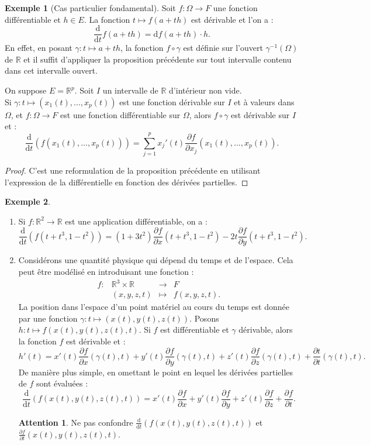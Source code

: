 \documentclass[french]{article}
\newcommand{\R}{\mathbb{R}}
\newcommand{\inv}{^{-1}}
\renewcommand{\d}{\text{d}}
\theoremstyle{plain}
\theoremstyle{definition}
\newtheorem*{ex}{Exemple}
\newtheorem*{attention}{Attention}
\theoremstyle{remark}
\begin{document}
\begin{ex}[Cas particulier fondamental]
	Soit $f:\Omega\to F$ une fonction différentiable et $h\in E$. La fonction $t\mapsto f(a+th)$ est dérivable et l'on a :
	$$\frac{\d}{\d t}f(a+th)=\d f(a+th)\cdot h.$$
	En effet, en posant $\gamma:t\mapsto a+th$, la fonction $f\circ\gamma$ est définie sur l'ouvert $\gamma\inv(\Omega)$ de $\R$ et il suffit d'appliquer la proposition précédente sur tout intervalle contenu dans cet intervalle ouvert.
\end{ex}

\begin{cor}%
	On suppose $E=\R^p$. Soit $I$ un intervalle de $\R$ d'intérieur non vide.\\
	Si $\gamma:t\mapsto(x_1(t),\ldots,x_p(t))$ est une fonction dérivable sur $I$ et à valeurs dans $\Omega$, et $f:\Omega\to F$ est une fonction différentiable sur $\Omega$, alors $f\circ\gamma$ est dérivable sur $I$ et :
	$$\frac{\d}{\d t}\left(f(x_1(t),\ldots,x_p(t))\right)=\sum_{j=1}^{p}x_j'(t)\frac{\partial f}{\partial x_j}(x_1(t),\ldots,x_p(t)).$$
\end{cor}
\begin{proof}
	C'est une reformulation de la proposition précédente en utilisant l'expression de la différentielle en fonction des dérivées partielles.
\end{proof}

\begin{ex}
	\begin{enumerate}
		\item Si $f:\R^2\to\R$ est une application différentiable, on a :
		$$\frac{\d}{\d t}\left(f(t+t^3,1-t^2)\right)=(1+3t^2)\frac{\partial f}{\partial x}(t+t^3,1-t^2)-2t\frac{\partial f}{\partial y}(t+t^3,1-t^2).$$
		\item Considérons une quantité physique qui dépend du temps et de l'espace. Cela peut être modélisé en introduisant une fonction :
		$$\begin{array}{lrcl}
			f:&\R^3\times\R&\longrightarrow&F\\
			&(x,y,z,t)&\longmapsto&f(x,y,z,t).
		\end{array}$$ La position dans l'espace d'un point matériel au cours du temps est donnée par une fonction $\gamma:t\mapsto(x(t),y(t),z(t))$. Posons $h:t\mapsto f(x(t),y(t),z(t),t)$. Si $f$ est différentiable et $\gamma$ dérivable, alors la fonction $f$ est dérivable et :
		$$h'(t)=x'(t)\frac{\partial f}{\partial x}(\gamma(t),t)+y'(t)\frac{\partial f}{\partial y}(\gamma(t),t)+z'(t)\frac{\partial f}{\partial z}(\gamma(t),t)+\frac{\partial t}{\partial t}(\gamma(t),t).$$
		De manière plus simple, en omettant le point en lequel les dérivées partielles de $f$ sont évaluées :
		$$\frac{\d}{\d t}\left(f(x(t),y(t),z(t),t)\right)=x'(t)\frac{\partial f}{\partial x}+y'(t)\frac{\partial f}{\partial y}+z'(t)\frac{\partial f}{\partial z}+\frac{\partial f}{\partial t}.$$
		\begin{attention}
			Ne pas confondre $\displaystyle\frac{\d}{\d t}\left(f(x(t),y(t),z(t),t)\right)$ et $\displaystyle\frac{\partial f}{\partial t}(x(t),y(t),z(t),t)$.
		\end{attention}
	\end{enumerate}
\end{ex}
\end{document}
